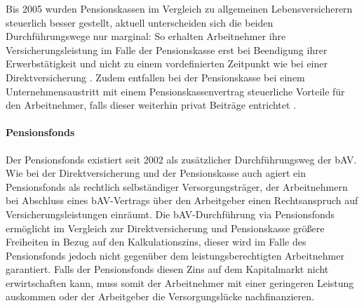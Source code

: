 Bis 2005 wurden Pensionskassen im Vergleich zu allgemeinen Lebensversicherern steuerlich besser gestellt, aktuell unterscheiden sich die beiden Durchführungswege nur marginal: So erhalten Arbeitnehmer ihre Versicherungsleistung im Falle der Pensionskasse erst bei Beendigung ihrer Erwerbstätigkeit und nicht zu einem vordefinierten Zeitpunkt wie bei einer Direktversicherung \cite[S. 191]{buttler2017einfuehrung}. Zudem entfallen bei der Pensionskasse bei einem Unternehmensaustritt mit einem Pensionskassenvertrag steuerliche Vorteile für den Arbeitnehmer, falls dieser weiterhin privat Beiträge entrichtet \cite[S. 192]{buttler2017einfuehrung}.

\paragraph*{Pensionsfonds}

Der Pensionsfonds existiert seit 2002 als zusätzlicher Durchführungsweg der bAV. Wie bei der Direktversicherung und der Pensionskasse auch agiert ein Pensionsfonds als rechtlich selbständiger Versorgungsträger, der Arbeitnehmern bei Abschluss eines bAV-Vertrags über den Arbeitgeber einen Rechtsanspruch auf Versicherungsleistungen einräumt. Die bAV-Durchführung via Pensionsfonds ermöglicht im Vergleich zur Direktversicherung und Pensionskasse größere Freiheiten in Bezug auf den Kalkulationszins, dieser wird im Falle des Pensionsfonds jedoch nicht gegenüber dem leistungsberechtigten Arbeitnehmer garantiert. Falls der Pensionsfonds diesen Zins auf dem Kapitalmarkt nicht erwirtschaften kann, muss somit der Arbeitnehmer mit einer geringeren Leistung auskommen oder der Arbeitgeber die Versorgungslücke nachfinanzieren. 


